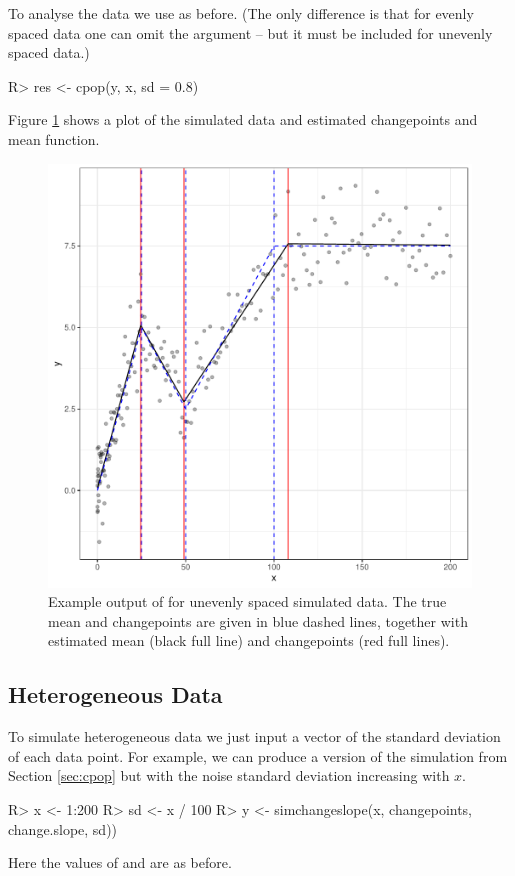 \documentclass[nojss]{jss}
\begin{document}
To analyse the data we use  as before. (The only difference is that for evenly spaced data one can omit the  argument -- but it must be included for unevenly spaced data.)
\begin{CodeChunk}
\begin{CodeInput}
R> res <- cpop(y, x, sd = 0.8)
\end{CodeInput}
\end{CodeChunk}
%
%
Figure \ref{fig:cpop-example-uneven} shows a plot of the simulated data and estimated changepoints and mean function.

\begin{figure}
\centering
\includegraphics[width=0.6\linewidth]{figures/cpop_example_uneven_ggplot.pdf}
\caption{Example output of  for unevenly spaced simulated data. The true mean and changepoints are given in blue dashed lines, together with estimated mean (black full line) and changepoints (red full lines). }
\label{fig:cpop-example-uneven}
\end{figure}
%
%
\subsection{Heterogeneous Data}

To simulate heterogeneous data we just input a vector of the standard deviation of each data point. For example, we can produce a version of the simulation from Section \ref{sec:cpop} but with the noise standard deviation increasing with $x$.

\begin{CodeChunk}
\begin{CodeInput}
R> x <- 1:200
R> sd <- x / 100
R> y <- simchangeslope(x, changepoints, change.slope, sd))
\end{CodeInput}
\end{CodeChunk}
%
%
Here the values of  and  are as before.
\end{document}
